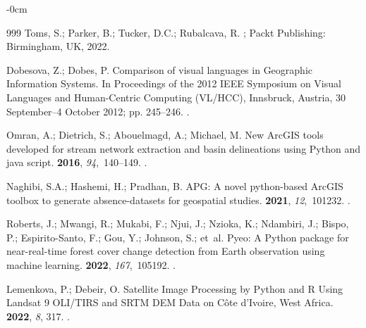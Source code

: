 \documentclass[geomatics,article,accept,pdftex,moreauthors]{Definitions/mdpi}
\begin{document}
\begin{adjustwidth}{-\extralength}{0cm}
\begin{thebibliography}{999}
Toms, S.; Parker, B.; Tucker, D.C.; Rubalcava, R.
; Packt Publishing: Birmingham, UK, 2022. %

Dobesova, Z.; Dobes, P.
\newblock Comparison of visual languages in Geographic Information Systems.
\newblock In Proceedings of the 2012 IEEE Symposium on Visual Languages and
  Human-Centric Computing (VL/HCC), Innsbruck, Austria, 30 September--4 October 2012; pp. 245--246. %
.

Omran, A.; Dietrich, S.; Abouelmagd, A.; Michael, M.
\newblock New ArcGIS tools developed for stream network extraction and basin
  delineations using Python and java script.
 {\bf 2016}, {\em 94},~140--149.
.

Naghibi, S.A.; Hashemi, H.; Pradhan, B.
\newblock APG: A novel python-based ArcGIS toolbox to generate absence-datasets
  for geospatial studies.
 {\bf 2021}, {\em 12},~101232.
.

Roberts, J.; Mwangi, R.; Mukabi, F.; Njui, J.; Nzioka, K.; Ndambiri, J.; Bispo,
  P.; Espirito-Santo, F.; Gou, Y.; Johnson, S.;  et~al.
\newblock Pyeo: A Python package for near-real-time forest cover change
  detection from Earth observation using machine learning.
 {\bf 2022}, {\em 167},~105192.
.

Lemenkova, P.; Debeir, O.
\newblock Satellite Image Processing by Python and R Using Landsat 9 OLI/TIRS
  and SRTM DEM Data on Côte d'Ivoire, West Africa.
 {\bf 2022}, {\em 8}, 317. %
.


\end{thebibliography}
\end{adjustwidth}
\end{document}
